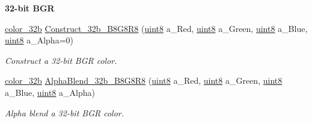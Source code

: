 \begin{Indent}{\bf 32-\/bit BGR}\par
\begin{DoxyCompactItemize}
\item 
\hyperlink{namespacetil_a8eb2d871b8a6ffb55b3eeb720207a6cb}{color\_\-32b} \hyperlink{namespacetil_ab3bc972471ad2a5739b7a3468c6fc5b7}{Construct\_\-32b\_\-B8G8R8} (\hyperlink{namespacetil_a7a75b0e7e2cd3f19ea51c8c02fd242f8}{uint8} a\_\-Red, \hyperlink{namespacetil_a7a75b0e7e2cd3f19ea51c8c02fd242f8}{uint8} a\_\-Green, \hyperlink{namespacetil_a7a75b0e7e2cd3f19ea51c8c02fd242f8}{uint8} a\_\-Blue, \hyperlink{namespacetil_a7a75b0e7e2cd3f19ea51c8c02fd242f8}{uint8} a\_\-Alpha=0)
\begin{DoxyCompactList}\small\item\em Construct a 32-\/bit BGR color. \item\end{DoxyCompactList}\item 
\hyperlink{namespacetil_a8eb2d871b8a6ffb55b3eeb720207a6cb}{color\_\-32b} \hyperlink{namespacetil_ad141ab11e843c3ad322d25bf38822cda}{AlphaBlend\_\-32b\_\-B8G8R8} (\hyperlink{namespacetil_a7a75b0e7e2cd3f19ea51c8c02fd242f8}{uint8} a\_\-Red, \hyperlink{namespacetil_a7a75b0e7e2cd3f19ea51c8c02fd242f8}{uint8} a\_\-Green, \hyperlink{namespacetil_a7a75b0e7e2cd3f19ea51c8c02fd242f8}{uint8} a\_\-Blue, \hyperlink{namespacetil_a7a75b0e7e2cd3f19ea51c8c02fd242f8}{uint8} a\_\-Alpha)
\begin{DoxyCompactList}\small\item\em Alpha blend a 32-\/bit BGR color. \item\end{DoxyCompactList}\end{DoxyCompactItemize}
\end{Indent}
